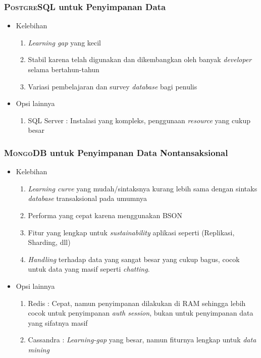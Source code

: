 	\subsubsection{\textsc{PostgreSQL} untuk Penyimpanan Data}
	\begin{itemize}
		\item Kelebihan
		\begin{enumerate}
			\item \textit{Learning gap} yang kecil
			\item Stabil karena telah digunakan dan dikembangkan oleh banyak \textit{developer} selama bertahun-tahun
			\item Variasi pembelajaran dan survey \textit{database} bagi penulis
		\end{enumerate}
		\item Opsi lainnya
		\begin{enumerate}
			\item SQL Server : Instalasi yang kompleks, penggunaan \textit{resource} yang cukup besar
		\end{enumerate}
	\end{itemize}
	
	\subsubsection{\textsc{MongoDB} untuk Penyimpanan Data Nontansaksional}
		\begin{itemize}
			\item Kelebihan
			\begin{enumerate}
				\item \textit{Learning curve} yang mudah/sintaksnya kurang lebih sama dengan sintaks \textit{database} transaksional pada umumnya
				\item Performa yang cepat karena menggunakan BSON
				\item Fitur yang lengkap untuk \textit{sustainability} aplikasi seperti (Replikasi, Sharding, dll)
				\item \textit{Handling} terhadap data yang sangat besar yang cukup bagus, cocok untuk data yang masif seperti \textit{chatting}.
			\end{enumerate}
			\item Opsi lainnya
			\begin{enumerate}
				\item Redis : Cepat, namun penyimpanan dilakukan di RAM sehingga lebih cocok untuk penyimpanan \textit{auth session}, bukan untuk penyimpanan data yang sifatnya masif
				\item Cassandra : \textit{Learning-gap} yang besar, namun fiturnya lengkap untuk \textit{data mining}
			\end{enumerate}
		\end{itemize}
		
